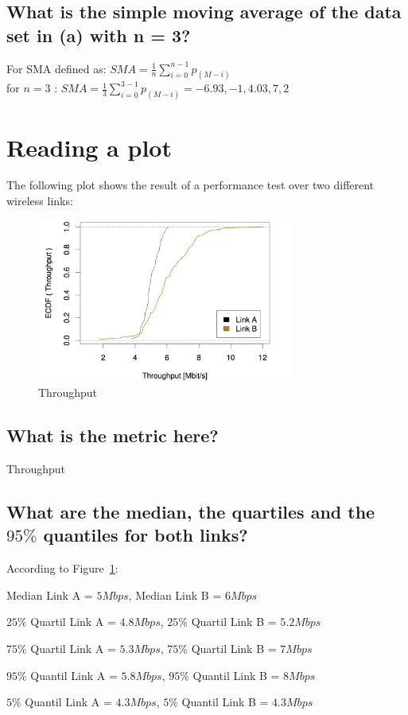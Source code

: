 \documentclass [12 pt , a4paper ] {article}
\begin{document}
 \subsection{What is the simple moving average of the data set in (a) with n = 3?}
 \par For SMA defined as: $SMA = \frac{1}{n} \sum\limits_{i=0}^{n-1} p_{(M-i)} $
 \\ for $n=3$ : $SMA = \frac{1}{3} \sum\limits_{i=0}^{3-1} p_{(M-i)} = -6.93, -1,4.03,7,2 $
 \section{Reading a plot}
 \par The following plot shows the result of a performance test over two different wireless links:
 \begin{figure}[!ht]
   \centering
   \includegraphics[scale=0.2,width=0.75\textwidth, natwidth=7000,natheight=1000]{2.png}
   \caption{Throughput}
   \label{fig:throughput}
 \end{figure}

 \subsection{What is the metric here?}
 \par Throughput
 \subsection{What are the median, the quartiles and the $95\%$ quantiles for both links?}
\par According to Figure~\ref{fig:throughput}:
 \par Median Link A = $5Mbps$, Median Link B = $6Mbps$
 \par $25\%$ Quartil Link A = $4.8Mbps$, $25\%$ Quartil Link B = $5.2Mbps$
 \par $75\%$ Quartil Link A = $5.3Mbps$, $75\%$ Quartil Link B = $7Mbps$
 \par $95\%$ Quantil Link A = $5.8Mbps$, $95\%$ Quantil Link B = $8Mbps$
 \par $5\%$ Quantil Link A = $4.3Mbps$, $5\%$ Quantil Link B = $4.3Mbps$
\end{document}
